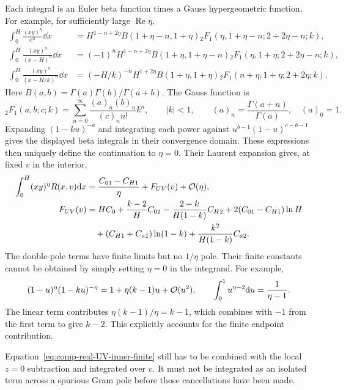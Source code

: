 Each integral is an Euler beta function times a Gauss
hypergeometric function. For example, for sufficiently large
$\operatorname{Re}\eta$,
\begin{align}
 \int_0^H\frac{(xy)^\eta}{x^n}\dd x
 &=H^{1-n+2\eta}B(1+\eta-n,1+\eta)
 {}_2F_1(\eta,1+\eta-n;2+2\eta-n;k),\\
 \int_0^H\frac{(xy)^\eta}{(x-H)^n}\dd x
 &=(-1)^nH^{1-n+2\eta}B(1+\eta,1+\eta-n)
 {}_2F_1(\eta,1+\eta;2+2\eta-n;k),\\
 \int_0^H\frac{(xy)^\eta}{(x-H/k)^n}\dd x
 &=(-H/k)^{-n}H^{1+2\eta}B(1+\eta,1+\eta)
 {}_2F_1(n+\eta,1+\eta;2+2\eta;k).
\end{align}
Here $B(a,b)=\Gamma(a)\Gamma(b)/\Gamma(a+b)$. The Gauss function is
\begin{equation}
 {}_2F_1(a,b;c;k)=\sum_{n=0}^{\infty}
 \frac{(a)_n(b)_n}{(c)_n n!}k^n,\qquad |k|<1,
 \qquad (a)_n=\frac{\Gamma(a+n)}{\Gamma(a)},\quad (a)_0=1.
\end{equation}
Expanding $(1-ku)^{-a}$ and integrating each power against
$u^{b-1}(1-u)^{c-b-1}$ gives the displayed beta integrals in their
convergence domain. These expressions
then uniquely define the continuation to $\eta=0$. Their Laurent
expansion gives, at fixed $v$ in the interior,
\begin{align}
 \int_0^H (xy)^\eta R(x,v)\dd x
 &=\frac{C_{01}-C_{H1}}\eta+F_{UV}(v)+\mathcal{O}(\eta),\\
 F_{UV}(v)&=H C_0+\frac{k-2}{H}C_{02}
 -\frac{2-k}{H(1-k)}C_{H2}
 +2(C_{01}-C_{H1})\ln H\\
 &\quad +(C_{H1}+C_{a1})\ln(1-k)
 +\frac{k^2}{H(1-k)}C_{a2}.
 \label{eq:comp-real-UV-inner-finite}
\end{align}
The double-pole terms have finite limits but no $1/\eta$ pole.
Their finite constants cannot be obtained by simply setting
$\eta=0$ in the integrand. For example,
\begin{equation}
 (1-u)^\eta(1-ku)^{-\eta}
 =1+\eta(k-1)u+\mathcal{O}(u^2),\qquad
 \int_0^1u^{\eta-2}\dd u=\frac1{\eta-1}.
\end{equation}
The linear term contributes $\eta(k-1)/\eta=k-1$, which combines
with $-1$ from the first term to give $k-2$.
This explicitly accounts for the finite endpoint contribution.

Equation~\eqref{eq:comp-real-UV-inner-finite} still has to be
combined with the local $z=0$ subtraction and integrated over $v$.
It must not be integrated as an isolated term across a spurious
Gram pole before those cancellations have been made.
